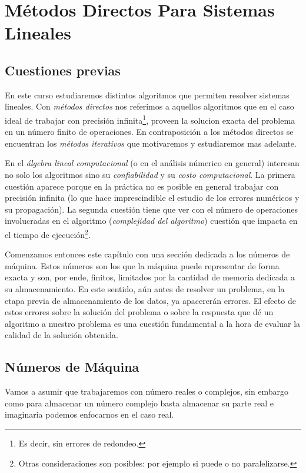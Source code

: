 \chapter{Métodos Directos Para Sistemas Lineales}
\setcounter{equation}{0}
\section{Cuestiones previas}

En este curso estudiaremos distintos algoritmos que permiten resolver sistemas lineales. Con \emph{métodos directos} nos referimos a aquellos algoritmos que en el caso ideal de trabajar con precisión infinita\footnote{Es decir, sin errores de redondeo.}, proveen la solucion exacta del problema
en un número finito de operaciones. En contraposición a los métodos directos se encuentran los \emph{métodos iterativos} que motivaremos y estudiaremos mas adelante.

En el \emph{álgebra lineal computacional} (o en el análisis númerico en general) interesan no solo los algoritmos sino su \emph{confiabilidad}  y su \emph{costo computacional}. La primera cuestión aparece porque en la práctica no es posible en general trabajar con precisión infinita (lo que hace imprescindible el  estudio de los errores numéricos y su propagación). La segunda cuestión tiene que ver con el número de operaciones involucradas en el algoritmo (\emph{complejidad del algoritmo}) cuestión que impacta en el tiempo de ejecución\footnote{Otras consideraciones son posibles: por ejemplo si puede o no paralelizarse.}.

Comenzamos entonces este capítulo con una sección dedicada a los números de máquina. Estos números son los que la máquina puede representar de forma exacta y son, por ende, finitos, limitados por la cantidad de memoria dedicada a su almacenamiento. En este sentido, aún antes de resolver un problema, en la etapa previa de almacenamiento de los datos, ya apacererán errores. El efecto de estos errores sobre la solución del problema o sobre la respuesta que dé un algoritmo a nuestro problema es una cuestión fundamental a la hora de evaluar la calidad de la solución obtenida.

\section{Números de Máquina}
Vamos a asumir que trabajaremos con número reales o complejos, sin embargo como para almacenar un número complejo basta almacenar su parte real e imaginaria podemos enfocarnos en el caso real.

